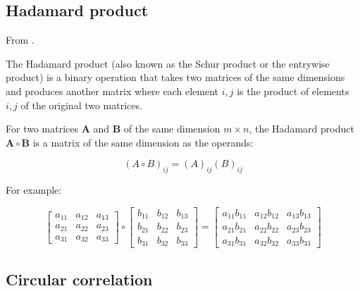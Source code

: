 \documentclass{article}
\begin{document}
\subsection{Hadamard product}
\label{subsec: Hadamard product}

From \cite{wiki2019hadamardProd}.

The Hadamard product (also known as the Schur product or the entrywise product) is a binary operation that takes two matrices of the same dimensions and produces another matrix where each element $i, j$ is the product of elements $i, j$ of the original two matrices. 

For two matrices $\mathbf{A}$ and $\mathbf{B}$ of the same dimension $m \times n$, the Hadamard product $\mathbf{A} \circ \mathbf{B}$ is a matrix of the same dimension as the operands:

\begin{equation}
    (A \circ B)_{i j}=(A)_{i j}(B)_{i j}
\end{equation}

For example:

\begin{equation}
    \left[ \begin{array}{ccc}{a_{11}} & {a_{12}} & {a_{13}} \\ {a_{21}} & {a_{22}} & {a_{23}} \\ {a_{31}} & {a_{32}} & {a_{33}}\end{array}\right] \circ \left[ \begin{array}{ccc}{b_{11}} & {b_{12}} & {b_{13}} \\ {b_{21}} & {b_{22}} & {b_{23}} \\ {b_{31}} & {b_{32}} & {b_{33}}\end{array}\right]=\left[ \begin{array}{ccc}{a_{11} b_{11}} & {a_{12} b_{12}} & {a_{13} b_{13}} \\ {a_{21} b_{21}} & {a_{22} b_{22}} & {a_{23} b_{23}} \\ {a_{31} b_{31}} & {a_{32} b_{32}} & {a_{33} b_{33}}\end{array}\right]
\end{equation}


\subsection{Circular correlation}
\label{subsec: Circular correlation}
\end{document}
